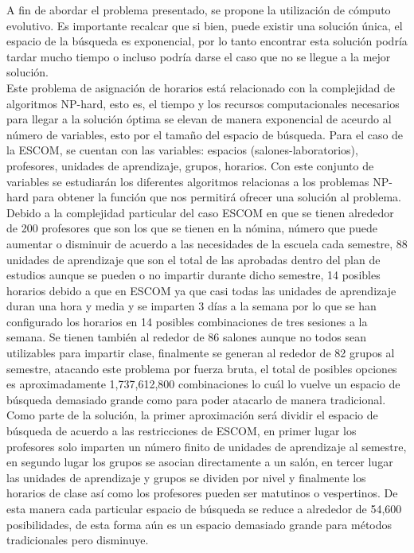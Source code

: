 \label{sec:introduccion}

A fin de abordar el problema presentado, se propone la utilización de cómputo evolutivo. Es importante recalcar que si bien, puede existir una solución única, el espacio de la búsqueda es exponencial, por lo tanto encontrar esta solución podría tardar mucho tiempo o incluso podría darse el caso que no se llegue a la mejor solución. \\

Este problema de asignación de horarios está relacionado con la complejidad de algoritmos NP-hard, esto es, el tiempo y los recursos computacionales necesarios para llegar a la solución óptima se elevan de manera exponencial de aceurdo al número de variables, esto por el tamaño del espacio de búsqueda. Para el caso de la ESCOM, se cuentan con las variables: espacios (salones-laboratorios), profesores, unidades de aprendizaje, grupos, horarios. Con este conjunto de variables se estudiarán los diferentes algoritmos relacionas a los problemas NP-hard para obtener la función que nos permitirá ofrecer una solución al problema.\\

Debido a la complejidad particular del caso ESCOM en que se tienen alrededor de 200 profesores que son los que se tienen en la nómina, número que puede aumentar o disminuir de acuerdo a las necesidades de la escuela cada semestre, 88 unidades de aprendizaje que son el total de las aprobadas dentro del plan de estudios aunque se pueden o no impartir durante dicho semestre, 14 posibles horarios debido a que en ESCOM ya que casi todas las unidades de aprendizaje duran una hora y media y se imparten 3 días a la semana por lo que se han configurado los horarios en 14 posibles combinaciones de tres sesiones a la semana. Se tienen también al rededor de 86 salones aunque no todos sean utilizables para impartir clase, finalmente se generan al rededor de 82 grupos al semestre, atacando este problema por fuerza bruta, el total de posibles opciones es aproximadamente 1,737,612,800 combinaciones lo cuál lo vuelve un espacio de búsqueda demasiado grande como para poder atacarlo de manera tradicional. \\

Como parte de la solución, la primer aproximación será dividir el espacio de búsqueda de acuerdo a las restricciones de ESCOM, en primer lugar los profesores solo imparten un número finito de unidades de aprendizaje al semestre, en segundo lugar los grupos se asocian directamente a un salón, en tercer lugar las unidades de aprendizaje y grupos se dividen por nivel y finalmente los horarios de clase así como los profesores pueden ser matutinos o vespertinos. De esta manera cada particular espacio de búsqueda se reduce a alrededor de 54,600 posibilidades, de esta forma aún es un espacio demasiado grande para métodos tradicionales pero disminuye.\\

